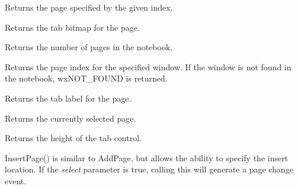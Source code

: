\label{wxauinotebookgetpage}


Returns the page specified by the given index.

\label{wxauinotebookgetpagebitmap}


Returns the tab bitmap for the page.

\label{wxauinotebookgetpagecount}


Returns the number of pages in the notebook.

\label{wxauinotebookgetpageindex}


Returns the page index for the specified window.  If the window is not found in
the notebook, wxNOT\_FOUND is returned.

\label{wxauinotebookgetpagetext}


Returns the tab label for the page.

\label{wxauinotebookgetselection}


Returns the currently selected page.

\label{wxauinotebookgettabctrlheight}


Returns the height of the tab control.

\label{wxauinotebookinsertpage}


InsertPage() is similar to AddPage, but allows the ability to specify the insert location.
If the {\it select} parameter is true, calling this will generate a page change event.

